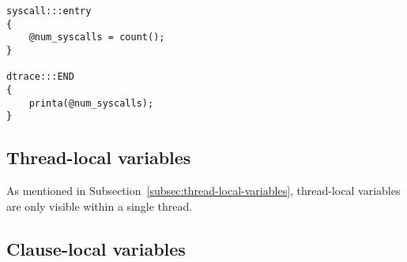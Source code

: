 \begin{verbatim}
syscall:::entry
{
    @num_syscalls = count();
}

dtrace:::END
{
    printa(@num_syscalls);
}
\end{verbatim}

\subsection{Thread-local variables}

As mentioned in Subsection~\ref{subsec:thread-local-variables}, thread-local variables are only
visible within a single thread.

\subsection{Clause-local variables}

